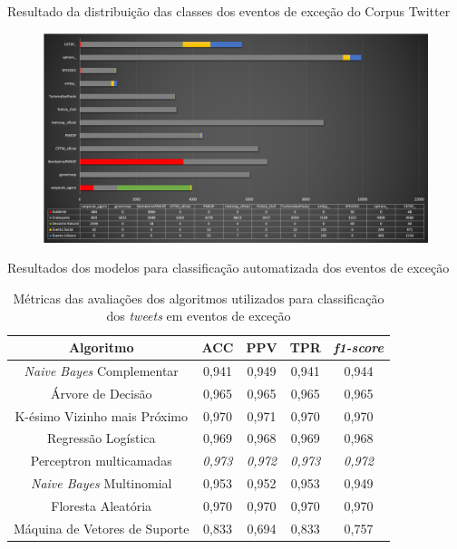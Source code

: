 \documentclass{beamer}
\begin{document}
\begin{frame}{Resultado da distribuição das classes dos eventos de exceção do Corpus Twitter}
\begin{figure}[!htb]%
	\centering
		\includegraphics[width=1\linewidth]{tweets_distribution_pt.png}
	\label{fig:pizza_bus}
\end{figure}
\end{frame}
\begin{frame}{Resultados dos modelos para classificação automatizada dos eventos de exceção}
\begin{table}[!htb]
\centering
\caption {Métricas das avaliações dos algoritmos utilizados para classificação dos \textit{tweets} em eventos de exceção}
\label {tab:metrics}
\begin{tabular}{c|c|c|c|c}
\toprule
\textbf{Algoritmo} & \textbf{ACC} & \textbf{PPV} & \textbf{TPR} & \textbf{\textit{f1-score}} \\
\midrule
\textit{Naive Bayes} Complementar & 0,941 & 0,949 & 0,941 & 0,944 \\
\hline
Árvore de Decisão & 0,965 & 0,965 & 0,965 & 0,965 \\
\hline
K-ésimo Vizinho mais Próximo & 0,970 & 0,971 & 0,970 & 0,970 \\
\hline
Regressão Logística & 0,969 & 0,968 & 0,969 & 0,968 \\
\hline
Perceptron multicamadas & \textit{0,973} & \textit{0,972} & \textit{0,973} & \textit{0,972} \\
\hline
\textit{Naive Bayes} Multinomial & 0,953 & 0,952 & 0,953 & 0,949 \\
\hline
Floresta Aleatória & 0,970 & 0,970 & 0,970 & 0,970 \\
\hline
Máquina de Vetores de Suporte & 0,833 & 0,694 & 0,833 & 0,757 \\
\bottomrule
\end{tabular}
\end{table}
\end{frame}
\end{document}
